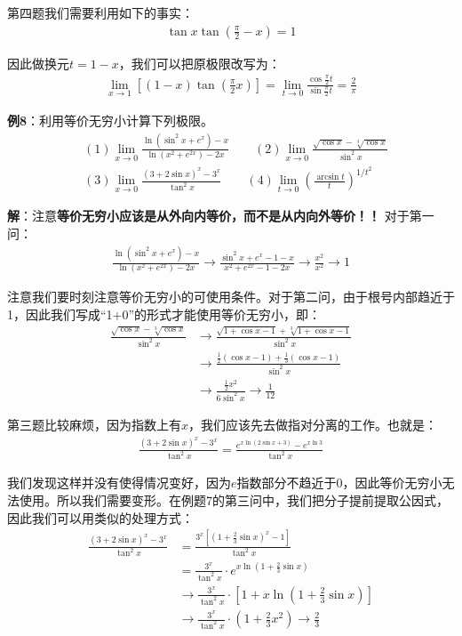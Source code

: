 \documentclass{ctexart}
\let\oldtextbf\textbf %
\renewcommand{\textbf}[1]{\textcolor{btex}{\oldtextbf{#1}}} %
\begin{document}
第四题我们需要利用如下的事实：
\begin{align*}
    \tan x\tan(\frac{\pi}{2}-x)=1
\end{align*}

因此做换元$t=1-x$，我们可以把原极限改写为：
\begin{align*}
    \lim_{x\to 1}[(1-x)\tan(\frac{\pi}{2}x)]=\lim_{t\to 0}\frac{\cos \frac{\pi}{2}t}{\sin \frac{\pi}{2}t}=\frac{2}{\pi}
\end{align*}

\textbf{例8}：利用等价无穷小计算下列极限。
\begin{align*}
&(1) \lim_{x\to 0}\frac{\ln(\sin^2 x+e^x)-x}{\ln(x^2+e^{2x})-2x} \qquad (2)\lim_{x\to 0}\frac{\sqrt
{\cos x}-\sqrt[3]{\cos x} }{\sin^2 x}\\
&(3)\lim_{x\to 0}\frac{(3+2\sin x)^x-3^x}{\tan^2 x}\qquad (4)\lim_{t\to 0}(\frac{\arcsin t}{t})^{1/t^2}
\end{align*}

\textbf{解}：注意\textbf{等价无穷小应该是从外向内等价，而不是从内向外等价！！}
对于第一问：
\begin{align*}
    \frac{\ln(\sin^2 x+e^x)-x}{\ln(x^2+e^{2x})-2x}\to\frac{\sin^2 x+e^x-1-x}{x^2+e^{2x}-1-2x}\to\frac{x^2}{x^2}\to 1
\end{align*}

注意我们要时刻注意等价无穷小的可使用条件。对于第二问，由于根号内部趋近于1，因此我们写成“1+0”的形式才能使用等价无穷小，即：
\begin{align*}
    \frac{\sqrt
{\cos x}-\sqrt[3]{\cos x} }{\sin^2 x}&\to\frac{\sqrt{1+\cos x-1}+\sqrt[3]{1+\cos x-1}}{\sin^2 x}\\
&\to \frac{\frac{1}{2}(\cos x-1)+\frac{1}{3}(\cos x-1)}{\sin^2 x}\\
&\to \frac{\frac{1}{2}x^2}{6\sin^2 x}\to\frac{1}{12}
\end{align*}

第三题比较麻烦，因为指数上有$x$，我们应该先去做指对分离的工作。也就是：
\begin{align*}
    \frac{(3+2\sin x)^x-3^x}{\tan^2 x}=\frac{e^{x\ln(2\sin x+3)}-e^{x\ln 3}}{\tan^2 x}
\end{align*}

我们发现这样并没有使得情况变好，因为$e$指数部分不趋近于0，因此等价无穷小无法使用。所以我们需要变形。在例题7的第三问中，我们把分子提前提取公因式，因此我们可以用类似的处理方式：
\begin{align*}
    \frac{(3+2\sin x)^x-3^x}{\tan^2 x}&=\frac{3^x[(1+\frac{2}{3}\sin x)^x-1]}{\tan^ 2 x}\\
    &=\frac{3^x}{\tan^2 x}\cdot e^{x\ln(1+\frac{2}{3}\sin x)}\\
    &\to \frac{3^x}{\tan^2 x}\cdot [1+x\ln(1+\frac{2}{3}\sin x)]\\
    &\to \frac{3^x}{\tan^2 x} \cdot (1+\frac{2}{3}x^2)\to\frac{2}{3}
\end{align*}
\end{document}
